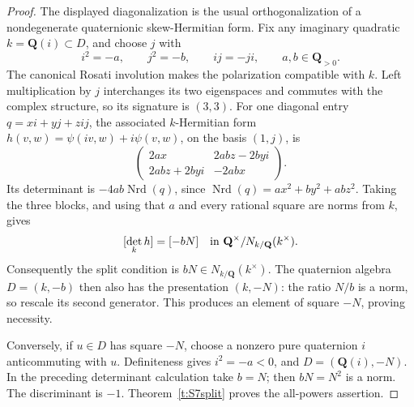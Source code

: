 \documentclass[11pt,reqno]{article}
\theoremstyle{emphasizedplain}
\theoremstyle{emphasizeddefinition}
\theoremstyle{emphasizeddefinition}
\newcommand{\Q}{\mathbf Q}
\begin{document}
\begin{proof}
The displayed diagonalization is the usual orthogonalization of a
nondegenerate quaternionic skew-Hermitian form. Fix any imaginary
quadratic $k=\Q(i)\subset D$, and choose $j$ with
\[
 i^2=-a,\qquad j^2=-b,\qquad ij=-ji,\qquad a,b\in\Q_{>0}.
\]
The canonical Rosati involution makes the polarization compatible with
$k$. Left multiplication by $j$ interchanges its two eigenspaces and
commutes with the complex structure, so its signature is $(3,3)$.
For one diagonal entry $q=xi+yj+zij$, the associated $k$-Hermitian
form $h(v,w)=\psi(iv,w)+i\psi(v,w)$, on the basis $(1,j)$, is
\[
 \begin{pmatrix}
 2ax&2abz-2byi\\
 2abz+2byi&-2abx
 \end{pmatrix}.
\]
Its determinant is $-4ab\operatorname{Nrd}(q)$, since
$\operatorname{Nrd}(q)=ax^2+by^2+abz^2$.
Taking the three blocks, and using that $a$ and every rational square
are norms from $k$, gives
\[
 [\det_k h]=[-bN]\quad\hbox{in }\Q^\times/N_{k/\Q}(k^\times).
\]
Consequently the split condition is $bN\in N_{k/\Q}(k^\times)$.
The quaternion algebra $D=(k,-b)$ then also has the presentation
$(k,-N)$: the ratio $N/b$ is a norm, so rescale its second generator.
This produces an element of square $-N$, proving necessity.

Conversely, if $u\in D$ has square $-N$, choose a nonzero pure
quaternion $i$ anticommuting with $u$. Definiteness gives $i^2=-a<0$,
and $D=(\Q(i),-N)$. In the preceding determinant calculation take
$b=N$; then $bN=N^2$ is a norm. The discriminant is $-1$.
Theorem~\ref{t:S7split} proves the all-powers assertion.
\end{proof}
\end{document}
